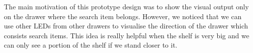 The main motivation of this prototype design was to show the visual output only on the drawer where the search item belongs.
However, we noticed that we can use other LEDs from other drawers to visualise the direction of the drawer which consists search items. 
This idea is really helpful when the shelf is very big and we can only see a portion of the shelf if we stand closer to it.